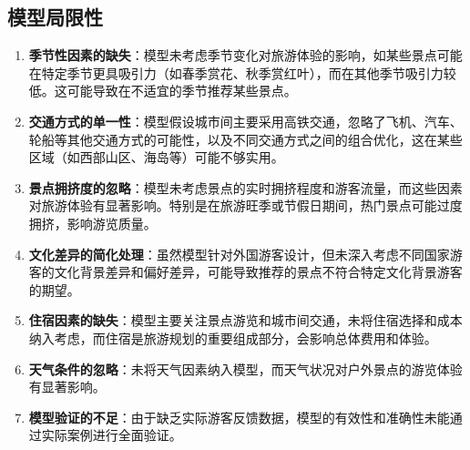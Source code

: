 \documentclass[withoutpreface,bwprint]{cumcmthesis} %
\begin{document}
\subsection{模型局限性}
\begin{enumerate}
    \item \textbf{季节性因素的缺失}：模型未考虑季节变化对旅游体验的影响，如某些景点可能在特定季节更具吸引力（如春季赏花、秋季赏红叶），而在其他季节吸引力较低。这可能导致在不适宜的季节推荐某些景点。
    
    \item \textbf{交通方式的单一性}：模型假设城市间主要采用高铁交通，忽略了飞机、汽车、轮船等其他交通方式的可能性，以及不同交通方式之间的组合优化，这在某些区域（如西部山区、海岛等）可能不够实用。
    
    \item \textbf{景点拥挤度的忽略}：模型未考虑景点的实时拥挤程度和游客流量，而这些因素对旅游体验有显著影响。特别是在旅游旺季或节假日期间，热门景点可能过度拥挤，影响游览质量。
    
    \item \textbf{文化差异的简化处理}：虽然模型针对外国游客设计，但未深入考虑不同国家游客的文化背景差异和偏好差异，可能导致推荐的景点不符合特定文化背景游客的期望。
    
    \item \textbf{住宿因素的缺失}：模型主要关注景点游览和城市间交通，未将住宿选择和成本纳入考虑，而住宿是旅游规划的重要组成部分，会影响总体费用和体验。
    
    \item \textbf{天气条件的忽略}：未将天气因素纳入模型，而天气状况对户外景点的游览体验有显著影响。
    
    \item \textbf{模型验证的不足}：由于缺乏实际游客反馈数据，模型的有效性和准确性未能通过实际案例进行全面验证。
\end{enumerate}
\end{document}
